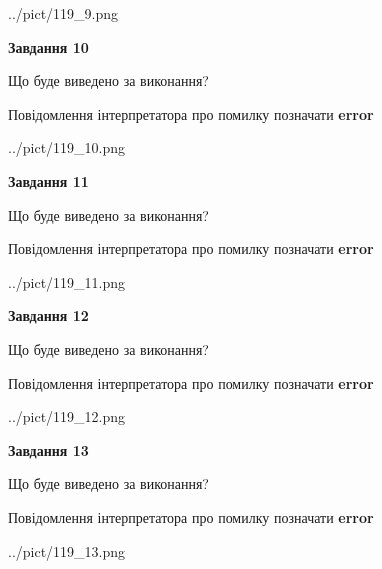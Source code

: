 \documentclass[11pt, ukrainian]{article}
\begin{document}
{\begin {large}
\begin{center}
	{../pict/119_9.png}
\end{center}
\newpage

{\begin {center}\textbf{Завдання 10}\end {center}}\par
Що буде виведено за виконання? \par
Повідомлення інтерпретатора про помилку позначати \textbf{error}

\begin{center}
	{../pict/119_10.png}
\end{center}
\newpage

{\begin {center}\textbf{Завдання 11}\end {center}}\par
Що буде виведено за виконання? \par
Повідомлення інтерпретатора про помилку позначати \textbf{error}

\begin{center}
	{../pict/119_11.png}
\end{center}
\newpage

{\begin {center}\textbf{Завдання 12}\end {center}}\par
Що буде виведено за виконання? \par
Повідомлення інтерпретатора про помилку позначати \textbf{error}

\begin{center}
	{../pict/119_12.png}
\end{center}
\newpage

{\begin {center}\textbf{Завдання 13}\end {center}}\par
Що буде виведено за виконання? \par
Повідомлення інтерпретатора про помилку позначати \textbf{error}

\begin{center}
	{../pict/119_13.png}
\end{center}
\newpage


\end{large}}
\end{document}
